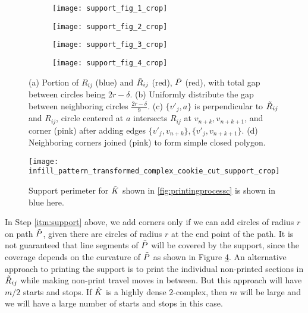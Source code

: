 \begin{enumerate}
 \begin{figure}[htp!]    
   \begin{subfigure}[t]{3in}
     \centering
     \texttt{[image: support\_fig\_1\_crop]}
     \vspace*{-0.25in}
     \caption{\label{fig:supporta}}
   \end{subfigure}
   \begin{subfigure}[t]{3in}
     \centering
     \texttt{[image: support\_fig\_2\_crop]}
     \vspace*{-0.25in}
     \caption{\label{fig:supportb}}
   \end{subfigure}
 
   \begin{subfigure}[t]{3in}
     \centering
     \texttt{[image: support\_fig\_3\_crop]}
     \vspace*{-0.25in}
     \caption{\label{fig:supportc}}
   \end{subfigure}	
   \begin{subfigure}[t]{3in}
     \centering
     \texttt{[image: support\_fig\_4\_crop]}
     \vspace*{-0.25in}
     \caption{\label{fig:supportd}}
   \end{subfigure}
   \caption{\label{fig:support}
     (a) Portion of $R_{ij}$ (blue) and $\tilde{R}_{ij}$ (red), $\tilde{P}$ (red), with total gap between circles being $2r - \delta$.
     (b) Uniformly distribute the gap between neighboring circles $\frac{2r - \delta}{9}$.
     (c) $\{v'_j, a\}$ is perpendicular to $\tilde{R}_{ij}$ and $R_{ij}$, circle centered at $a$ intersects $R_{ij}$ at $v_{n+k}, v_{n+k+1}$, and corner (pink) after adding edges $\{v'_j, v_{n+k}\}, \{v'_j, v_{n + k + 1}\}$.
     (d) Neighboring corners joined (pink) to form simple closed polygon.
     }
 \end{figure}    

 \begin{figure}[htp!] 
   \centering
   \vfill
   \texttt{[image: infill\_pattern\_transformed\_complex\_cookie\_cut\_support\_crop]}
   \caption{Support perimeter for $\tilde{K}$ shown in \cref{fig:printingprocessc} is shown in blue here. }
   \label{fig:supportperimeter}
 \end{figure}   	 
\end{enumerate}



\begin{rem}
  {\rm 
  In Step \ref{itm:support} above, we add corners only if we can add circles of radius $r$ on path $\tilde{P}$, given there are circles of radius $r$ at the end point of the path.
  It is not guaranteed that line segments of $\tilde{P}$ will be covered by the support, since the coverage depends on the curvature of $\tilde{P}$ as shown in Figure \ref{fig:supportd}.
  An alternative approach to printing the support is to print the individual non-printed sections in $\tilde{R}_{ij}$ while making non-print travel moves in between.
  But this approach will have $m/2$ starts and stops.
  If $\hat{K}$ is a highly dense $2$-complex, then $m$ will be large and we will have a large number of starts and stops in this case.
  }
\end{rem}

